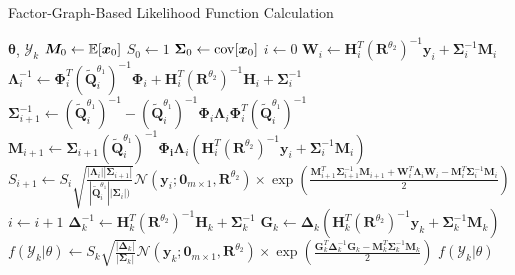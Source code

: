 \begin{algorithm}[]
\caption{Factor-Graph-Based Likelihood Function Calculation}
\begin{algorithmic}[1]
    \label{al:likelihood}
\REQUIRE $\bm{\theta}$, $\mathcal{Y}_k$
\STATE $\bm{ M}_0 \leftarrow \mathbb{E}[\bm{ x}_0]$
\STATE $S_0 \leftarrow 1$
\STATE $\bm { \Sigma}_0 \leftarrow {\rm cov}[\bm{ x}_0]$
\STATE $i \leftarrow 0$
    \STATE $\bm{ W}_i\leftarrow \bm{ H}_i^T(\bm{ R}^{\theta_2})^{-1}\bm{ y}_i + \bm { \Sigma}_i^{-1}\bm{ M}_i$
    \STATE $\bm{ \Lambda}_i^{-1}\leftarrow \bm{ \Phi}_i^T(\bm{ \tilde Q}_i^{\theta_1})^{-1}\bm{ \Phi}_i + \bm{ H}_i^{T}(\bm{ R}^{\theta_2})^{-1}\bm{ H}_i+\bm { \Sigma}_i^{-1}$
    \STATE $\bm { \Sigma}_{i+1}^{-1}\leftarrow (\bm{ \tilde Q}_i^{\theta_1})^{-1} - (\bm{ \tilde Q}_i^{\theta_1})^{-1}\bm{ \Phi}_i\bm{ \Lambda}_i\bm{ \Phi}_i^T(\bm{ \tilde Q}_i^{\theta_1})^{-1}$
    \STATE $\bm{ M}_{i+1}\leftarrow \bm { \Sigma}_{i+1}(\bm{ \tilde Q}_i^{\theta_1})^{-1}\bm{ \Phi_i}\bm{ \Lambda}_i(\bm{ H}_i^T(\bm{ R}^{\theta_2})^{-1}\bm{ y}_i+\bm { \Sigma}_i^{-1}\bm{ M}_i)$
    \STATE $S_{i+1} \leftarrow S_i\sqrt{\frac{|\bm{\Lambda}_i||\bm{\Sigma}_{i+1}|}{|\bm{ \tilde Q}_i^{\theta_1}||\bm{\Sigma}_i|)}}\mathcal{N}(\bm{y}_i;\bm{0}_{m\times1},\bm{R}^{{\theta}_2})\times\exp(\frac{\bm{M}^T_{i+1}\bm{\Sigma}^{-1}_{i+1}\bm{M}_{i+1}+\bm{W}^T_{i}\bm{\Lambda}_{i}\bm{W}_{i}-\bm{M}^T_{i}\bm{\Sigma}^{-1}_{i}\bm{M}_{i}}{2})$
    \STATE $i \leftarrow i+1$
\ENDWHILE
\STATE $\bm{ \Delta}_k^{-1}\leftarrow \bm{ H}_k^T(\bm{ R}^{\theta_2})^{-1}\bm{ H}_k + \bm { \Sigma}_k^{-1}$
\STATE $\bm{ G}_k \leftarrow \bm{ \Delta}_k(\bm{ H}_k^T(\bm{ R}^{\theta_2})^{-1}\bm{ y}_k + \bm { \Sigma}_k^{-1}\bm{ M}_k)$
\STATE $f(\mathcal{Y}_k|\theta) \leftarrow S_k\sqrt{\frac{|\bm{\Delta}_k|}{|\bm{\Sigma}_k|}}\mathcal{N}(\bm{y}_k;\bm {0}_{m\times 1}, \bm{R}^{{\theta}_2})\times \exp(\frac{\bm{G}^T_{k}\bm{\Delta}^{-1}_{k}\bm{G}_{k}-\bm{M}^T_{k}\bm{\Sigma}^{-1}_{k}\bm{M}_{k}}{2})$
\ENSURE $f(\mathcal{Y}_k|\theta)$
\end{algorithmic}
\end{algorithm}
